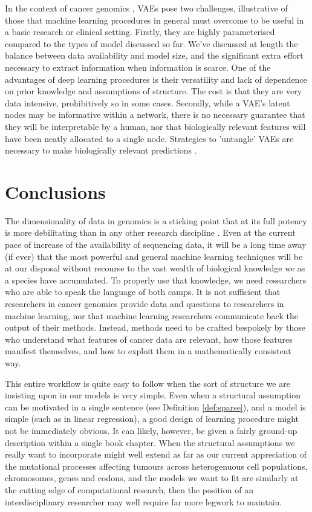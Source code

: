 \documentclass[thesis.tex]{subfiles}
\begin{document}
In the context of cancer genomics \citep{way_extracting_2018}, VAEs pose two challenges, illustrative of those that machine learning procedures in general must overcome to be useful in a basic research or clinical setting. Firstly, they are highly parameterised compared to the types of model discussed so far. We've discussed at length the balance between data availability and model size, and the significant extra effort necessary to extract information when information is scarce. One of the advantages of deep learning procedures is their versatility and lack of dependence on prior knowledge and assumptions of structure. The cost is that they are very data intensive, prohibitively so in some cases. Secondly, while a VAE's latent nodes may be informative within a network, there is no necessary guarantee that they will be interpretable by a human, nor that biologically relevant features will have been neatly allocated to a single node. Strategies to 'untangle' VAEs are necessary to make biologically relevant predictions \citep{kompa_learning_2020}. 


\section{Conclusions}
The dimensionality of data in genomics is a sticking point that at its full potency is more debilitating than in any other research discipline \citep{barbour_precision_2019}. Even at the current pace of increase of the availability of sequencing data, it will be a long time away (if ever) that the most powerful and general machine learning techniques will be at our disposal without recourse to the vast wealth of biological knowledge we as a species have accumulated. To properly use that knowledge, we need researchers who are able to speak the language of both camps. It is not sufficient that researchers in cancer genomics provide data and questions to researchers in machine learning, nor that machine learning researchers communicate back the output of their methods. Instead, methods need to be crafted bespokely by those who understand what features of cancer data are relevant, how those features manifest themselves, and how to exploit them in a mathematically consistent way. 

This entire workflow is quite easy to follow when the sort of structure we are insisting upon in our models is very simple. Even when a structural assumption can be motivated in a single sentence (see Definition \ref{def:sparse}), and a model is simple (such as in linear regression), a good design of learning procedure might not be immediately obvious. It can likely, however, be given a fairly ground-up description within a single book chapter. When the structural assumptions we really want to incorporate might well extend as far as our current appreciation of the mutational processes affecting tumours across heterogenuous cell populations, chromosomes, genes and codons, and the models we want to fit are similarly at the cutting edge of computational research, then the position of an interdisciplinary researcher may well require far more legwork to maintain. 
\end{document}
